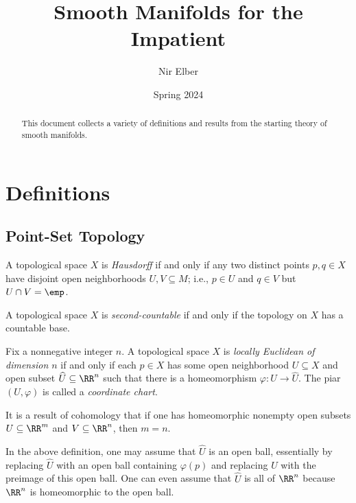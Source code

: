 \documentclass{article}
\title{Smooth Manifolds for the Impatient}
\author{Nir Elber}
\date{Spring 2024}
\begin{document}
\maketitle

\begin{abstract}
	This document collects a variety of definitions and results from the starting theory of smooth manifolds.
\end{abstract}

\tableofcontents

\newpage

\section{Definitions}

\subsection{Point-Set Topology}
\begin{definition}[Hausdorff]
	A topological space $X$ is \textit{Hausdorff} if and only if any two distinct points $p,q\in X$ have disjoint open neighborhoods $U,V\subseteq M$; i.e., $p\in U$ and $q\in V$ but $U\cap V=\emp$.
\end{definition}
\begin{definition}
	A topological space $X$ is \textit{second-countable} if and only if the topology on $X$ has a countable base.
\end{definition}
\begin{definition}
	Fix a nonnegative integer $n$. A topological space $X$ is \textit{locally Euclidean of dimension $n$} if and only if each $p\in X$ has some open neighborhood $U\subseteq X$ and open subset $\widehat U\subseteq\RR^n$ such that there is a homeomorphism $\varphi\colon U\to\widehat U$. The piar $(U,\varphi)$ is called a \textit{coordinate chart}.
\end{definition}
\begin{remark}
	It is a result of cohomology that if one has homeomorphic nonempty open subsets $U\subseteq\RR^m$ and $V\subseteq\RR^n$, then $m=n$.
\end{remark}
\begin{remark}
	In the above definition, one may assume that $\widehat U$ is an open ball, essentially by replacing $\widehat U$ with an open ball containing $\varphi(p)$ and replacing $U$ with the preimage of this open ball. One can even assume that $\widehat U$ is all of $\RR^n$ because $\RR^n$ is homeomorphic to the open ball.
\end{remark}
\end{document}
